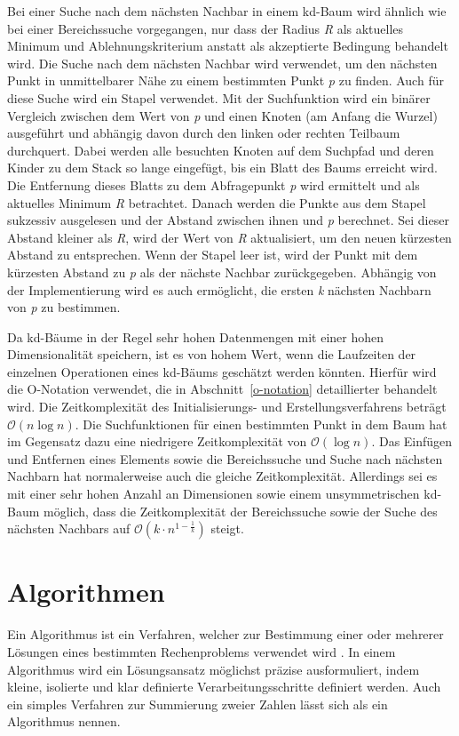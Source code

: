 Bei einer Suche nach dem nächsten Nachbar in einem kd-Baum wird ähnlich wie bei einer Bereichssuche vorgegangen, nur dass der Radius \textit{R} als aktuelles Minimum und Ablehnungskriterium anstatt als akzeptierte Bedingung behandelt wird. Die Suche nach dem nächsten Nachbar wird verwendet, um den nächsten Punkt in unmittelbarer Nähe zu einem bestimmten Punkt \textit{p} zu finden. Auch für diese Suche wird ein Stapel verwendet. Mit der Suchfunktion wird ein binärer Vergleich zwischen dem Wert von \textit{p} und einen Knoten (am Anfang die Wurzel) ausgeführt und abhängig davon durch den linken oder rechten Teilbaum durchquert. Dabei werden alle besuchten Knoten auf dem Suchpfad und deren Kinder zu dem Stack so lange eingefügt, bis ein Blatt des Baums erreicht wird. Die Entfernung dieses Blatts zu dem Abfragepunkt \textit{p} wird ermittelt und als aktuelles Minimum \textit{R} betrachtet. Danach werden die Punkte aus dem Stapel sukzessiv ausgelesen und der Abstand zwischen ihnen und \textit{p} berechnet. Sei dieser Abstand kleiner als \textit{R}, wird der Wert von \textit{R} aktualisiert, um den neuen kürzesten Abstand zu entsprechen. Wenn der Stapel leer ist, wird der Punkt mit dem kürzesten Abstand zu \textit{p} als der nächste Nachbar zurückgegeben. Abhängig von der Implementierung wird es auch ermöglicht, die ersten \textit{k} nächsten Nachbarn von \textit{p} zu bestimmen. \autocite[96]{saha_advanced_2019}

Da kd-Bäume in der Regel sehr hohen Datenmengen mit einer hohen Dimensionalität speichern, ist es von hohem Wert, wenn die Laufzeiten der einzelnen Operationen eines kd-Bäums geschätzt werden könnten. Hierfür wird die O-Notation verwendet, die in Abschnitt~\ref{o-notation} detaillierter behandelt wird. Die Zeitkomplexität des Initialisierungs- und Erstellungsverfahrens beträgt $\mathcal{O}(n\log n)$. Die Suchfunktionen für einen bestimmten Punkt in dem Baum hat im Gegensatz dazu eine niedrigere Zeitkomplexität von $\mathcal{O}(\log n)$. Das Einfügen und Entfernen eines Elements sowie die Bereichssuche und Suche nach nächsten Nachbarn hat normalerweise auch die gleiche Zeitkomplexität. Allerdings sei es mit einer sehr hohen Anzahl an Dimensionen sowie einem unsymmetrischen  kd-Baum möglich, dass die Zeitkomplexität der Bereichssuche sowie der Suche des nächsten Nachbars auf $\mathcal{O}(k \cdot n^{1-\frac{1}{k}})$ steigt. \autocite[104-105]{bentley_fast_1978} \autocite[94-96]{saha_advanced_2019}

\section{Algorithmen}
Ein Algorithmus ist ein Verfahren, welcher zur Bestimmung einer oder mehrerer Lösungen eines bestimmten Rechenproblems verwendet wird \autocite[1]{knebl_algorithmen_2021}. In einem Algorithmus wird ein Lösungsansatz möglichst präzise ausformuliert, indem kleine, isolierte und klar definierte Verarbeitungsschritte definiert werden. Auch ein simples Verfahren zur Summierung zweier Zahlen lässt sich als ein Algorithmus nennen. \autocite[9-10]{hubwieser_fundamente_2015}

